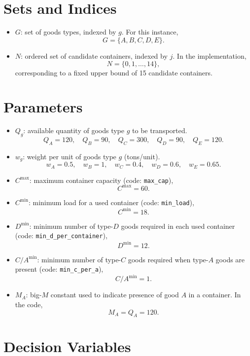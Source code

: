 \section*{Sets and Indices}

\begin{itemize}
    \item $G$: set of goods types, indexed by $g$. For this instance,
    \[
    G=\{A,B,C,D,E\}.
    \]
    \item $N$: ordered set of candidate containers, indexed by $j$. In the implementation,
    \[
    N=\{0,1,\dots,14\},
    \]
    corresponding to a fixed upper bound of 15 candidate containers.
\end{itemize}

\section*{Parameters}

\begin{itemize}
    \item $Q_g$: available quantity of goods type $g$ to be transported.
    \[
    Q_A=120,\quad Q_B=90,\quad Q_C=300,\quad Q_D=90,\quad Q_E=120.
    \]
    \item $w_g$: weight per unit of goods type $g$ (tons/unit).
    \[
    w_A=0.5,\quad w_B=1,\quad w_C=0.4,\quad w_D=0.6,\quad w_E=0.65.
    \]
    \item $C^{\max}$: maximum container capacity (code: \texttt{max\_cap}),
    \[
    C^{\max}=60.
    \]
    \item $C^{\min}$: minimum load for a used container (code: \texttt{min\_load}),
    \[
    C^{\min}=18.
    \]
    \item $D^{\min}$: minimum number of type-$D$ goods required in each used container (code: \texttt{min\_d\_per\_container}),
    \[
    D^{\min}=12.
    \]
    \item $C/A^{\min}$: minimum number of type-$C$ goods required when type-$A$ goods are present (code: \texttt{min\_c\_per\_a}),
    \[
    C/A^{\min}=1.
    \]
    \item $M_A$: big-$M$ constant used to indicate presence of good $A$ in a container. In the code,
    \[
    M_A = Q_A = 120.
    \]
\end{itemize}

\section*{Decision Variables}

